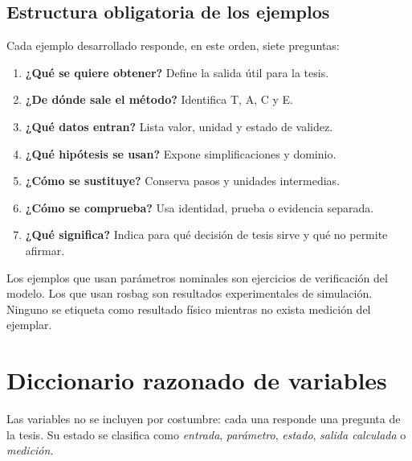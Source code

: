 \documentclass[11pt,letterpaper]{article}
\begin{document}
\subsection{Estructura obligatoria de los ejemplos}
Cada ejemplo desarrollado responde, en este orden, siete preguntas:
\begin{enumerate}
 \item \textbf{¿Qué se quiere obtener?} Define la salida útil para la tesis.
 \item \textbf{¿De dónde sale el método?} Identifica T, A, C y E.
 \item \textbf{¿Qué datos entran?} Lista valor, unidad y estado de validez.
 \item \textbf{¿Qué hipótesis se usan?} Expone simplificaciones y dominio.
 \item \textbf{¿Cómo se sustituye?} Conserva pasos y unidades intermedias.
 \item \textbf{¿Cómo se comprueba?} Usa identidad, prueba o evidencia separada.
 \item \textbf{¿Qué significa?} Indica para qué decisión de tesis sirve y qué
 no permite afirmar.
\end{enumerate}
Los ejemplos que usan parámetros nominales son ejercicios de verificación del
modelo. Los que usan rosbag son resultados experimentales de simulación. Ninguno
se etiqueta como resultado físico mientras no exista medición del ejemplar.

\section{Diccionario razonado de variables}
Las variables no se incluyen por costumbre: cada una responde una pregunta de
la tesis. Su estado se clasifica como \emph{entrada}, \emph{parámetro},
\emph{estado}, \emph{salida calculada} o \emph{medición}.
\end{document}

